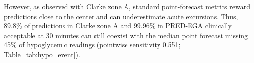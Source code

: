 \documentclass[journal]{IEEEtran}
\begin{document}
However, as observed with Clarke zone A, standard point-forecast metrics reward predictions close to the center and can underestimate acute excursions. Thus, 89.8\% of predictions in Clarke zone A and 99.96\% in PRED-EGA clinically acceptable at 30 minutes can still coexist with the median point forecast missing 45\% of hypoglycemic readings (pointwise sensitivity 0.551; Table~\ref{tab:hypo_event}).

\summarytable
{}\of\summarytable \global\let\ClAa=\pgfplotsretval
{}\of\summarytable \global\let\ClAb=\pgfplotsretval
{}\of\summarytable \global\let\ClAc=\pgfplotsretval
{}\of\summarytable \global\let\ClAd=\pgfplotsretval
{}\of\summarytable \global\let\ClBa=\pgfplotsretval
{}\of\summarytable \global\let\ClBb=\pgfplotsretval
{}\of\summarytable \global\let\ClBc=\pgfplotsretval
{}\of\summarytable \global\let\ClBd=\pgfplotsretval
{}\of\summarytable \global\let\ClCa=\pgfplotsretval
{}\of\summarytable \global\let\ClCb=\pgfplotsretval
{}\of\summarytable \global\let\ClCc=\pgfplotsretval
{}\of\summarytable \global\let\ClCd=\pgfplotsretval
{}\of\summarytable \global\let\ClDa=\pgfplotsretval
{}\of\summarytable \global\let\ClDb=\pgfplotsretval
{}\of\summarytable \global\let\ClDc=\pgfplotsretval
{}\of\summarytable \global\let\ClDd=\pgfplotsretval
{}\of\summarytable \global\let\ClEa=\pgfplotsretval
{}\of\summarytable \global\let\ClEb=\pgfplotsretval
{}\of\summarytable \global\let\ClEc=\pgfplotsretval
{}\of\summarytable \global\let\ClEd=\pgfplotsretval
\end{document}
